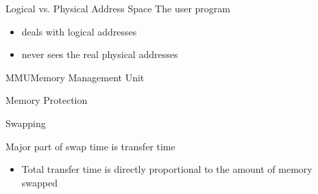 \begin{frame}{Logical vs. Physical Address Space}%
  The user program
  \begin{itemize}
  \item deals with logical addresses
  \item never sees the real physical addresses
  \end{itemize}
  \centering
\end{frame}

\begin{frame}{MMU}{Memory Management Unit}
  \centering
  \mode<beamer>{ \texttt{[image: mos-figs-4-9]} }%
\end{frame}

\begin{frame}{Memory Protection}
  \begin{center}
  \end{center}
\end{frame}

\begin{frame}{Swapping}
  \begin{center}
  \end{center}
  \begin{iblock}{Major part of swap time is transfer time}
    \begin{itemize}
    \item[] Total transfer time is directly proportional to the amount of memory swapped
    \end{itemize}
  \end{iblock}
\end{frame}

